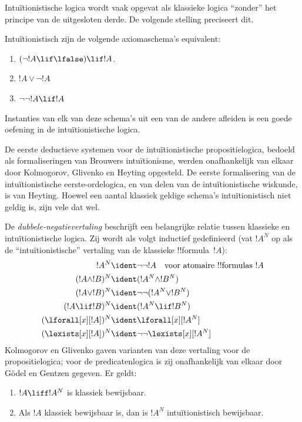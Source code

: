 \documentclass[../../../include/open-logic-section]{subfiles}
\begin{document}
Intuïtionistische logica wordt vaak opgevat als klassieke logica ``zonder'' het
principe van de uitgesloten derde. De volgende stelling preciseert dit.
\begin{thm}
Intuïtionistisch zijn de volgende axiomaschema's equivalent:
\begin{enumerate}
\item $(\lnot !A \lif \lfalse) \lif !A$.
\item $!A \lor \lnot !A$
\item $\lnot \lnot !A \lif !A$
\end{enumerate}
\end{thm}
Instanties van elk van deze schema's uit een van de andere afleiden is een goede
oefening in de intuïtionistische logica.

De eerste deductieve systemen voor de intuïtionistische propositielogica, bedoeld
als formaliseringen van Brouwers intuïtionisme, werden onafhankelijk van elkaar
door Kolmogorov, Glivenko en Heyting opgesteld. De eerste formalisering van de
intuïtionistische eerste-ordelogica, en van delen van de intuïtionistische
wiskunde, is van Heyting. Hoewel een aantal klassiek geldige schema's
intuïtionistisch niet geldig is, zijn vele dat wel.

De \emph{dubbele-negatievertaling} beschrijft een belangrijke relatie tussen
klassieke en intuïtionistische logica. Zij wordt als volgt inductief gedefinieerd
(vat $!A^N$ op als de ``intuïtionistische'' vertaling van de klassieke
!!{formula}~$!A$):
\begin{align*}
!A^N & \ident \lnot\lnot !A \quad \text{voor atomaire !!{formula}s $!A$} \\
(!A \land !B)^N & \ident (!A^N \land !B^N) \\
(!A \lor !B)^N & \ident  \lnot\lnot (!A^N \lor !B^N) \\
(!A \lif !B)^N & \ident (!A^N \lif !B^N) \\
(\lforall[x][!A])^N & \ident \lforall[x][!A^N] \\
(\lexists[x][!A])^N & \ident \lnot\lnot\lexists[x][!A^N]
\end{align*}
Kolmogorov en Glivenko gaven varianten van deze vertaling voor de
propositielogica; voor de predicatenlogica is zij onafhankelijk van elkaar door
G\"odel en Gentzen gegeven. Er geldt:

\begin{thm}
\begin{enumerate}
\item $!A \liff !A^N$ is klassiek bewijsbaar.
\item Als $!A$ klassiek bewijsbaar is, dan is $!A^N$ intuïtionistisch
  bewijsbaar.
\end{enumerate}
\end{thm}
\end{document}
